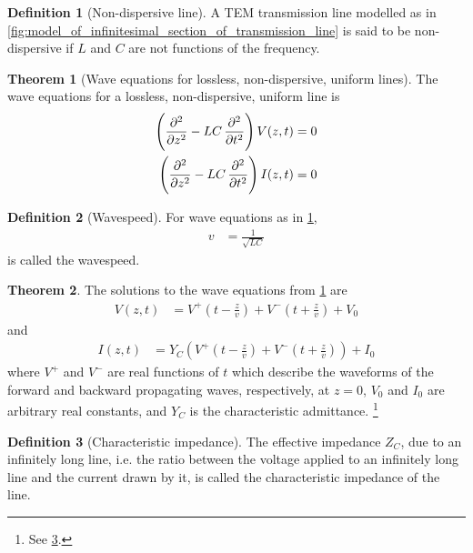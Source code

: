 \documentclass[titlepage, fleqn, a4paper, 12pt, twoside]{article}
\theoremstyle{definition}
\newtheorem{definition}{Definition}
\theoremstyle{theorem}
\newtheorem{theorem}{Theorem}
\begin{document}
\begin{definition}[Non-dispersive line]
	A TEM transmission line modelled as in \cref{fig:model_of_infinitesimal_section_of_transmission_line} is said to be non-dispersive if $L$ and $C$ are not functions of the frequency.
\end{definition}

\begin{theorem}[Wave equations for lossless, non-dispersive, uniform lines]
	The wave equations for a lossless, non-dispersive, uniform line is
	\begin{align*}
		\left( \dpd[2]{}{z} - L C \dpd[2]{}{t} \right) V(z,t) &= 0\\
		\left( \dpd[2]{}{z} - L C \dpd[2]{}{t} \right) I(z,t) &= 0
	\end{align*}
	\label{thm:wave_equations_for_lossless_non-dispersive_uniform_lines}
\end{theorem}

\begin{definition}[Wavespeed]
	For wave equations as in \cref{thm:wave_equations_for_lossless_non-dispersive_uniform_lines},
	\begin{align*}
		v &= \frac{1}{\sqrt{L C}}
	\end{align*}
	is called the wavespeed.
\end{definition}

\begin{theorem}
	The solutions to the wave equations from \cref{thm:wave_equations_for_lossless_non-dispersive_uniform_lines} are
	\begin{align*}
		V(z,t) &= V^+\left( t - \frac{z}{v} \right) + V^-\left( t + \frac{z}{v} \right) + V_0
	\end{align*}
	and
	\begin{align*}
		I(z,t) &= Y_C \left( V^+\left( t - \frac{z}{v} \right) + V^-\left( t + \frac{z}{v} \right) \right) + I_0
	\end{align*}
	where $V^+$ and $V^-$ are real functions of $t$ which describe the waveforms of the forward and backward propagating waves, respectively, at $z = 0$, $V_0$ and $I_0$ are arbitrary real constants, and $Y_C$ is the characteristic admittance.
	\footnote{See \cref{def:characteristic_impedance}.}
\end{theorem}

\begin{definition}[Characteristic impedance]
	The effective impedance $Z_C$, due to an infinitely long line, i.e. the ratio between the voltage applied to an infinitely long line and the current drawn by it, is called the characteristic impedance of the line.
	\label{def:characteristic_impedance}
\end{definition}
\end{document}
